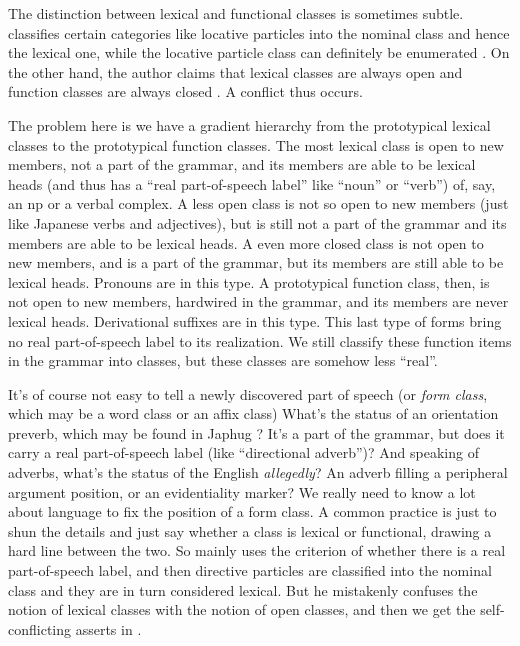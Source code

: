 \documentclass[UTF8, a4paper, oneside, scheme=plain]{ctexrep}
\newcommand*{\citesec}[1]{\S~{#1}}
\newcommand*{\term}[1]{\emph{#1}}
\newcommand{\corpus}[1]{\emph{#1}}
\begin{document}
The distinction between lexical and functional classes is sometimes subtle.
\citep[\citesec{3.6}]{zhudexigrammar} classifies 
certain categories like locative particles %
into the nominal class and hence the lexical one,
while the locative particle class can definitely be enumerated \citep[\citesec{4.4}]{zhudexigrammar}.
On the other hand, 
the author claims that lexical classes are always open 
and function classes are always closed \citet[\citesec{3.4}]{zhudexigrammar}.
A conflict thus occurs.

The problem here is we have a gradient hierarchy 
from the prototypical lexical classes 
to the prototypical function classes.
The most lexical class is open to new members, 
not a part of the grammar,
and its members are able to be lexical heads
(and thus has a ``real part-of-speech label'' 
like ``noun'' or ``verb'') 
of, say, an \acs{np} or a verbal complex.
A less open class is not so open to new members 
(just like Japanese verbs and adjectives),
but is still not a part of the grammar 
and its members are able to be lexical heads. 
A even more closed class is not open to new members,
and is a part of the grammar,
but its members are still able to be lexical heads.
Pronouns are in this type.
A prototypical function class, then, 
is not open to new members, hardwired in the grammar, 
and its members are never lexical heads.
Derivational suffixes are in this type.
This last type of forms 
bring no real part-of-speech label to its realization.
We still classify these function items in the grammar into classes,
but these classes are somehow less ``real''.

It's of course not easy to tell a newly discovered part of speech 
(or \term{form class}, which may be a word class or an affix class)
What's the status of an orientation preverb, 
which may be found in Japhug \citep{jacques2021grammar}?
It's a part of the grammar,
but does it carry a real part-of-speech label (like ``directional adverb'')?
And speaking of adverbs, what's the status of the English \corpus{allegedly}?
An adverb filling a peripheral argument position,
or an evidentiality marker?
We really need to know a lot about language to fix the position of a form class.
A common practice is just to shun the details and just say whether a class is lexical or functional,
drawing a hard line between the two.
So \citet{zhudexigrammar} mainly uses the criterion of whether there is a real part-of-speech label,
and then directive particles are classified into the nominal class 
and they are in turn considered lexical.
But he mistakenly confuses the notion of lexical classes with the notion of open classes,
and then we get the self-conflicting asserts in \citet[\citesec{3.4}]{zhudexigrammar}.
\end{document}
